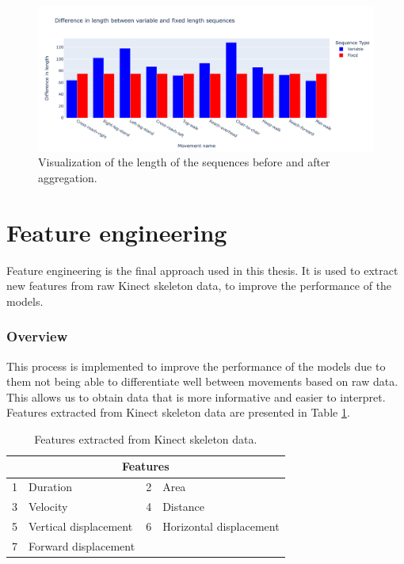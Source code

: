 \begin{figure}[H]
    \centering
    \includegraphics[width=1.0\textwidth]{../src/resources/plots/splits/seq_len.png}
    \caption{
        Visualization of the length of the sequences before and after aggregation.
    }
    \label{fig:seqlength}
\end{figure}

    \newpage
    
    \section{Feature engineering} \label{sec:feature_engineering}
        
        Feature engineering is the final approach used in this thesis. It is used to extract new features from raw Kinect skeleton data, to improve the performance of the models.

        \subsubsection{Overview}

            This process is implemented to improve the performance of the models due to them not being able to differentiate well between movements based on raw data. This allows us to obtain data that is more informative and easier to interpret. Features extracted from Kinect skeleton data are presented in Table \ref{tab:features_table}.

        \begin{table}[htbp]
            \centering
            \caption{Features extracted from Kinect skeleton data.}
            \label{tab:features_table}
            \begin{tabular}{@{}clcl@{}}
                \toprule
                \multicolumn{4}{c}{\textbf{Features}} \\
                \midrule
                1 & Duration & 2 & Area \\
                3 & Velocity & 4 & Distance \\
                5 & Vertical displacement & 6 & Horizontal displacement \\
                7 & Forward displacement &  & \\
                \bottomrule
            \end{tabular}
        \end{table}

